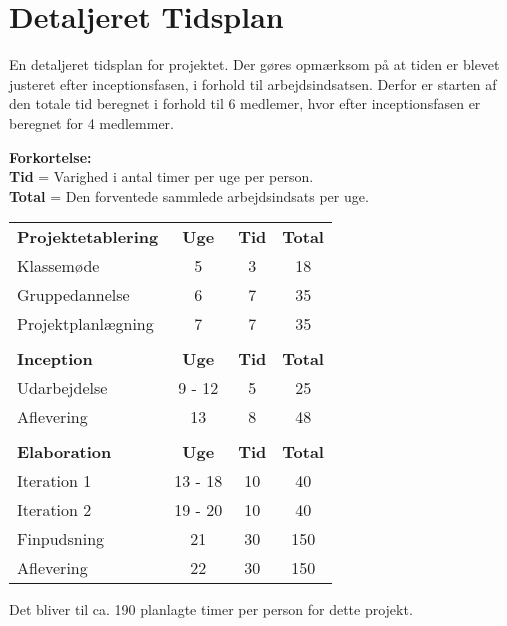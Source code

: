\newpage
\section{Detaljeret Tidsplan}

En detaljeret tidsplan for projektet. Der gøres opmærksom på at tiden er blevet justeret efter inceptionsfasen, i forhold til arbejdsindsatsen. Derfor er starten af den totale tid beregnet i forhold til 6 medlemer, hvor efter inceptionsfasen er beregnet for 4 medlemmer.

\hfill \newline
\textbf{Forkortelse:}  \\
\textbf{Tid} = Varighed i antal timer per uge per person.\\
\textbf{Total} = Den forventede sammlede arbejdsindsats per uge.

\begin{table}[ht]
	\begin{tabular}{lccc}
		\textbf{Projektetablering} 
        & \textbf{Uge}
        & \textbf{Tid} 
        & \textbf{Total}\\
        Klassemøde & 5 & 3 & 18\\
        Gruppedannelse &  6  & 7 & 35\\
        Projektplanlægning & 7 & 7 & 35 \\
        & & & \\
        \textbf{Inception} & \textbf{Uge} & \textbf{Tid} & \textbf{Total} \\
        Udarbejdelse & 9 - 12 & 5 & 25 \\
        Aflevering & 13 & 8 & 48 \\
        & & \\
        \textbf{Elaboration} & \textbf{Uge} & \textbf{Tid} &\textbf{Total} \\
        Iteration 1 & 13 - 18 & 10 & 40 \\
        Iteration 2 & 19 - 20 & 10 & 40 \\
        Finpudsning & 21 & 30 & 150  \\
        Aflevering & 22 & 30 & 150\\
	\end{tabular}
\end{table}

Det bliver til ca. 190 planlagte timer per person for dette projekt.

\onecolumn